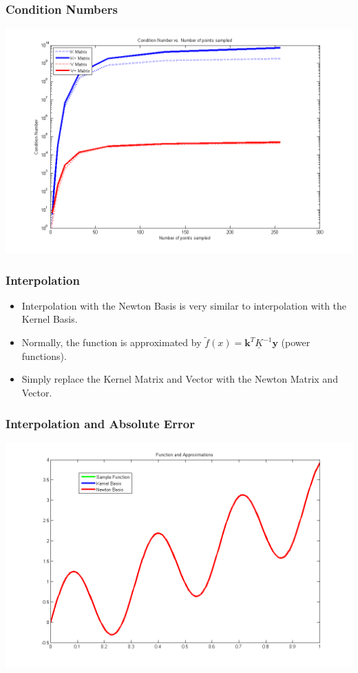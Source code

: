 \documentclass{beamer}
\begin{document}
\begin{frame}
\frametitle{Condition Numbers}
\includegraphics[scale = .45]{condNum}
\end{frame}

\begin{frame}
\frametitle{Interpolation}
\begin{itemize}
\item Interpolation with the Newton Basis is very similar to interpolation with the Kernel Basis.
\item Normally, the function is approximated by $\tilde{f}(x)=\textbf{k}^{T}\underline{K}^{-1}\textbf{y}$ (power functions).
\item Simply replace the Kernel Matrix and Vector with the Newton Matrix and Vector.
\end{itemize}
\end{frame}

\begin{frame}
\frametitle{Interpolation and Absolute Error}
\includegraphics[scale = .45]{functionAppx}
\end{frame}
\end{document}
